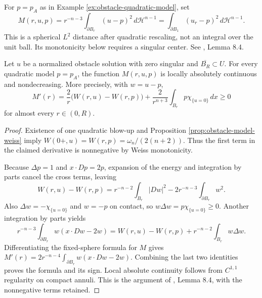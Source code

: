 \begin{definition}\label{def:obstacle-monneau}
For $p=p_A$ as in Example \ref{ex:obstacle-quadratic-model}, set
\[
 M(r,u,p)=r^{-n-3}\int_{\partial B_r}(u-p)^2\,d\mathcal H^{n-1}
 =\int_{\partial B_1}(u_r-p)^2\,d\mathcal H^{n-1}.
\]
This is a spherical $L^2$ distance after quadratic rescaling, not an integral over the unit ball. Its monotonicity below requires a singular center. See \cite{Fig18}, Lemma 8.4.
\end{definition}

\begin{theorem}\label{thm:obstacle-monneau-monotonicity}
Let $u$ be a normalized obstacle solution with zero singular and $\overline{B_R}\subset U$. For every quadratic model $p=p_A$, the function $M(r,u,p)$ is locally absolutely continuous and nondecreasing. More precisely, with $w=u-p$,
\[
 M'(r)=\frac2r\bigl(W(r,u)-W(r,p)\bigr)
       +\frac{2}{r^{n+3}}\int_{B_r}p\chi_{\{u=0\}}\,dx
 \geq0
\]
for almost every $r\in(0,R)$.
\end{theorem}
\begin{proof}
Existence of one quadratic blow-up and Proposition \ref{prop:obstacle-model-weiss} imply
$W(0+,u)=W(r,p)=\omega_n/(2(n+2))$. Thus the first term in the claimed derivative is nonnegative by Weiss monotonicity.

Because $\Delta p=1$ and $x\cdot Dp=2p$, expansion of the energy and integration by parts cancel the cross terms, leaving
\[
 W(r,u)-W(r,p)=r^{-n-2}\int_{B_r}|Dw|^2
                         -2r^{-n-3}\int_{\partial B_r}w^2.
\]
Also $\Delta w=-\chi_{\{u=0\}}$ and $w=-p$ on contact, so $w\Delta w=p\chi_{\{u=0\}}\geq0$. Another integration by parts yields
\[
 r^{-n-3}\int_{\partial B_r}w(x\cdot Dw-2w)
 =W(r,u)-W(r,p)+r^{-n-2}\int_{B_r}w\Delta w.
\]
Differentiating the fixed-sphere formula for $M$ gives
$M'(r)=2r^{-n-4}\int_{\partial B_r}w(x\cdot Dw-2w)$. Combining the last two identities proves the formula and its sign. Local absolute continuity follows from $C^{1,1}$ regularity on compact annuli. This is the argument of \cite{Fig18}, Lemma 8.4, with the nonnegative terms retained.
\end{proof}

